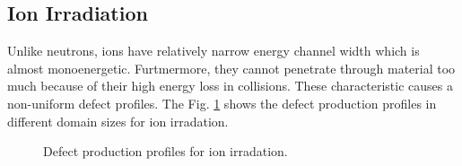\documentclass[a4paper]{article}
\begin{document}
  \subsection{Ion Irradiation} \hspace{10pt}
  Unlike neutrons, ions have relatively narrow energy channel width which is almost monoenergetic. Furtmermore, they cannot penetrate through material too much because of their high energy loss in collisions. These characteristic causes a non-uniform defect profiles. The Fig. \ref{figure:defect_production_500-5000nm} shows the defect production profiles in different domain sizes for ion irradation.
    \begin{figure}[h!]  %
      \centering
      \qquad
      \caption{Defect production profiles for ion irradation.}
      \label{figure:defect_production_500-5000nm}
    \end{figure}
\end{document}
